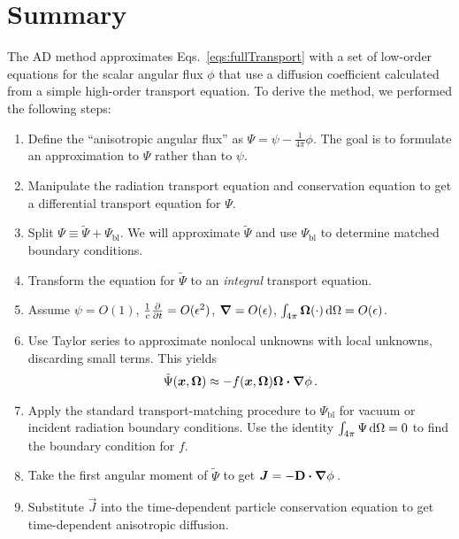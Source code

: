 \section{Summary}
The AD method approximates Eqs.~\eqref{eqs:fullTransport} with a set of
low-order equations for the scalar angular flux $\phi$ that use a diffusion
coefficient calculated from a simple high-order transport equation.
To derive the method, we performed the following steps:
\prelistpar\begin{enumerate}
  \item Define the ``anisotropic angular flux'' as $\Psi = \psi -
    \frac{1}{4\pi}\phi$.
    The goal is to formulate an approximation to $\Psi$ rather than to $\psi$.
  \item Manipulate the radiation transport equation and conservation equation to
    get a differential transport equation for $\Psi$.
  \item 
    Split $\Psi \equiv \tilde \Psi + \Psi_\mathrm{bl}$. We will approximate
    $\tilde \Psi$ and use $\Psi_\mathrm{bl}$ to determine matched boundary
    conditions.
  \item Transform the equation for $\tilde \Psi$ to an
    \emph{integral} transport equation.
  \item Assume $\psi=O(1)$, $\frac1c\frac{\partial }{\partial t}=O(\epsilon^2)$, $\bm{\nabla} =
    O(\epsilon)$, $\int_{4\pi} \bm{\Omega} (\cdot) \mathop{}\!\mathrm{d}\Omega = O(\epsilon)$.
  \item Use Taylor series to approximate nonlocal unknowns with local
    unknowns, discarding small terms. This yields
    \begin{equation*}
      \tilde \Psi(\bm{x}, \bm{\Omega})
      \approx - f(\bm{x}, \bm{\Omega})  \bm{\Omega} \bm{\cdot} \bm{\nabla} \phi\,.
    \end{equation*}
  \item Apply the standard transport-matching procedure to $\Psi_\mathrm{bl}$
    for vacuum or incident radiation boundary conditions. Use
    the identity $\int_{4\pi} \Psi \mathop{}\!\mathrm{d}\Omega=0$ to find the boundary condition
    for $f$.
  \item Take the first angular moment of $\tilde \Psi$ to get
    $\bm{J}=-\mathbf{D} \bm{\cdot} \bm{\nabla} \phi$\,.
  \item Substitute $\vec{J}$ into the time-dependent particle
    conservation equation to get time-dependent anisotropic diffusion.
\end{enumerate}


